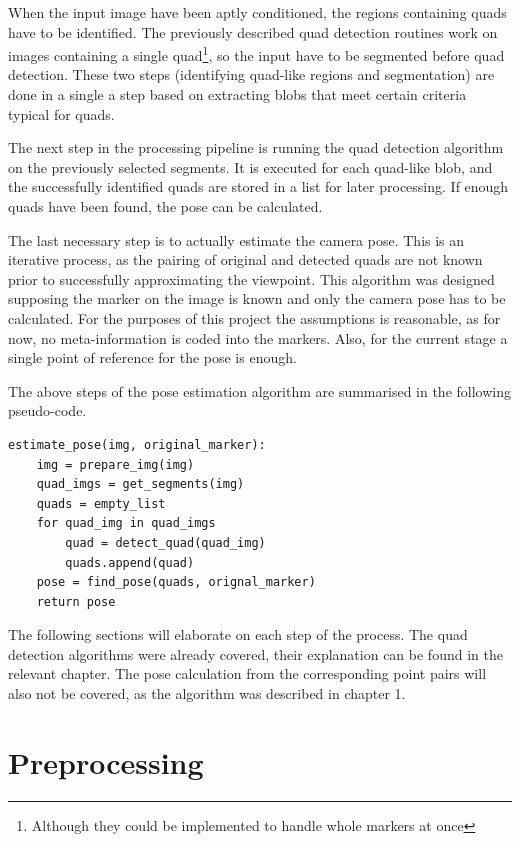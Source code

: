 When the input image have been aptly conditioned, the regions containing quads have to be identified.
The previously described quad detection routines work on images containing a single quad\footnote{Although they could be implemented to handle whole markers at once}, so the input have to be segmented before quad detection.
These two steps (identifying quad-like regions and segmentation) are done in a single a step based on extracting blobs that meet certain criteria typical for quads.

The next step in the processing pipeline is running the quad detection algorithm on the previously selected segments.
It is executed for each quad-like blob, and the successfully identified quads are stored in a list for later processing.
If enough quads have been found, the pose can be calculated.

The last necessary step is to actually estimate the camera pose.
This is an iterative process, as the pairing of original and detected quads are not known prior to successfully approximating the viewpoint.
This algorithm was designed supposing the marker on the image is known and only the camera pose has to be calculated.
For the purposes of this project the assumptions is reasonable, as for now, no meta-information is coded into the markers.
Also, for the current stage a single point of reference for the pose is enough.

The above steps of the pose estimation algorithm are summarised in the following pseudo-code.
\begin{lstlisting}
estimate_pose(img, original_marker):
    img = prepare_img(img)
    quad_imgs = get_segments(img)
    quads = empty_list
    for quad_img in quad_imgs
        quad = detect_quad(quad_img)
        quads.append(quad)
	pose = find_pose(quads, orignal_marker) 
	return pose
\end{lstlisting}
The following sections will elaborate on each step of the process.
The quad detection algorithms were already covered, their explanation can be found in the relevant chapter.
The pose calculation from the corresponding point pairs will also not be covered, as the algorithm was described in chapter 1.

\section{Preprocessing}

